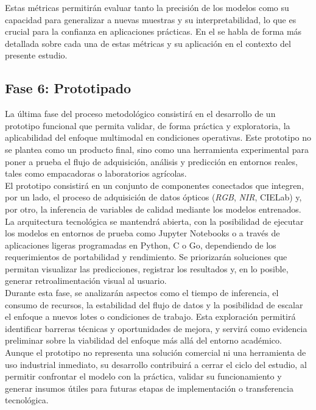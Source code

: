 Estas métricas permitirán evaluar tanto la precisión de los modelos como su capacidad para generalizar a nuevas muestras y su interpretabilidad, lo que es crucial para la confianza en aplicaciones prácticas. En el  se habla de forma más detallada sobre cada una de estas métricas y su aplicación en el contexto del presente estudio.

\subsection{Fase 6: Prototipado}

La última fase del proceso metodológico consistirá en el desarrollo de un prototipo funcional que permita validar, de forma práctica y exploratoria, la aplicabilidad del enfoque multimodal en condiciones operativas. Este prototipo no se plantea como un producto final, sino como una herramienta experimental para poner a prueba el flujo de adquisición, análisis y predicción en entornos reales, tales como empacadoras o laboratorios agrícolas.\\

El prototipo consistirá en un conjunto de componentes conectados que integren, por un lado, el proceso de adquisición de datos ópticos (\textit{RGB}, \textit{NIR}, CIELab) y, por otro, la inferencia de variables de calidad mediante los modelos entrenados. La arquitectura tecnológica se mantendrá abierta, con la posibilidad de ejecutar los modelos en entornos de prueba como Jupyter Notebooks o a través de aplicaciones ligeras programadas en Python, C o Go, dependiendo de los requerimientos de portabilidad y rendimiento. Se priorizarán soluciones que permitan visualizar las predicciones, registrar los resultados y, en lo posible, generar retroalimentación visual al usuario.\\

Durante esta fase, se analizarán aspectos como el tiempo de inferencia, el consumo de recursos, la estabilidad del flujo de datos y la posibilidad de escalar el enfoque a nuevos lotes o condiciones de trabajo. Esta exploración permitirá identificar barreras técnicas y oportunidades de mejora, y servirá como evidencia preliminar sobre la viabilidad del enfoque más allá del entorno académico.\\

Aunque el prototipo no representa una solución comercial ni una herramienta de uso industrial inmediato, su desarrollo contribuirá a cerrar el ciclo del estudio, al permitir confrontar el modelo con la práctica, validar su funcionamiento y generar insumos útiles para futuras etapas de implementación o transferencia tecnológica.

